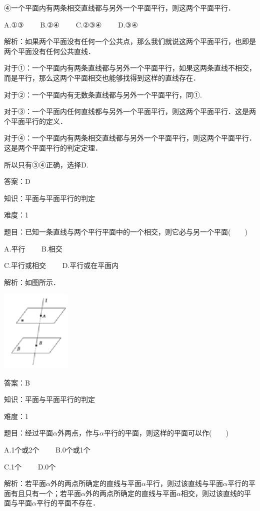 \documentclass{article} %
\begin{document}
④一个平面内有两条相交直线都与另外一个平面平行，则这两个平面平行．

A.①③　　 B.②④　　 C.②③④　　 D.③④

解析：如果两个平面没有任何一个公共点，那么我们就说这两个平面平行，也即是两个平面没有任何公共直线．

对于①：一个平面内有两条直线都与另外一个平面平行，如果这两条直线不相交，而是平行，那么这两个平面相交也能够找得到这样的直线存在．

对于②：一个平面内有无数条直线都与另外一个平面平行，同①.

对于③：一个平面内任何直线都与另外一个平面平行，则这两个平面平行．这是两个平面平行的定义．

对于④：一个平面内有两条相交直线都与另外一个平面平行，则这两个平面平行．这是两个平面平行的判定定理．

所以只有③④正确，选择D.

答案：D　

知识：平面与平面平行的判定

难度：1

题目：已知一条直线与两个平行平面中的一个相交，则它必与另一个平面(　　)

A.平行　　  B.相交

C.平行或相交　　  D.平行或在平面内

解析：如图所示．

\includegraphics*[width=1.32in, height=1.55in, keepaspectratio=false]{image146}

答案：B

知识：平面与平面平行的判定

难度：1

题目：经过平面\textit{$\alpha$}外两点，作与\textit{$\alpha$}平行的平面，则这样的平面可以作(　　)

A.1个或2个　　  B.0个或1个

C.1个　　  D.0个

解析：若平面\textit{$\alpha$}外的两点所确定的直线与平面\textit{$\alpha$}平行，则过该直线与平面\textit{$\alpha$}平行的平面有且只有一个；若平面\textit{$\alpha$}外的两点所确定的直线与平面\textit{$\alpha$}相交，则过该直线的平面与平面\textit{$\alpha$}平行的平面不存在．
\end{document}
